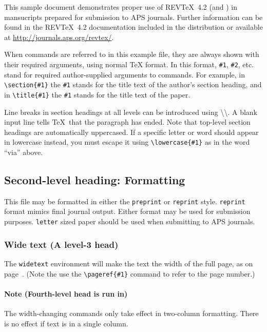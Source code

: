 \documentclass[%
 reprint,
 amsmath,amssymb,
 aps,
]{revtex4-2}
\begin{document}
This sample document demonstrates proper use of REV\TeX~4.2 (and
\LaTeXe) in mansucripts prepared for submission to APS
journals. Further information can be found in the REV\TeX~4.2
documentation included in the distribution or available at
\url{http://journals.aps.org/revtex/}.

When commands are referred to in this example file, they are always
shown with their required arguments, using normal \TeX{} format. In
this format, \verb+#1+, \verb+#2+, etc. stand for required
author-supplied arguments to commands. For example, in
\verb+\section{#1}+ the \verb+#1+ stands for the title text of the
author's section heading, and in \verb+\title{#1}+ the \verb+#1+
stands for the title text of the paper.

Line breaks in section headings at all levels can be introduced using
\textbackslash\textbackslash. A blank input line tells \TeX\ that the
paragraph has ended. Note that top-level section headings are
automatically uppercased. If a specific letter or word should appear in
lowercase instead, you must escape it using \verb+\lowercase{#1}+ as
in the word ``via'' above.

\subsection{\label{sec:level2}Second-level heading: Formatting}

This file may be formatted in either the \texttt{preprint} or
\texttt{reprint} style. \texttt{reprint} format mimics final journal output. 
Either format may be used for submission purposes. \texttt{letter} sized paper should
be used when submitting to APS journals.

\subsubsection{Wide text (A level-3 head)}
The \texttt{widetext} environment will make the text the width of the
full page, as on page~\pageref{eq:wideeq}. (Note the use the
\verb+\pageref{#1}+ command to refer to the page number.) 
\paragraph{Note (Fourth-level head is run in)}
The width-changing commands only take effect in two-column formatting. 
There is no effect if text is in a single column.
\end{document}
